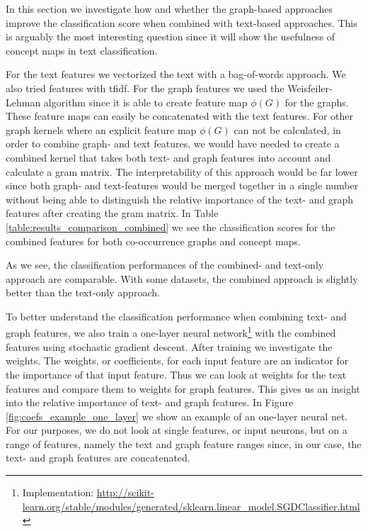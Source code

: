 In this section we investigate how and whether the graph-based approaches improve the classification score when combined with text-based approaches.
This is arguably the most interesting question since it will show the usefulness of concept maps in text classification.

For the text features we vectorized the text with a bag-of-words approach. We also tried features with tfidf.
For the graph features we used the Weisfeiler-Lehman algorithm since it is able to create feature map $\phi(G)$ for the graphs.
These feature maps can easily be concatenated with the text features.
For other graph kernels where an explicit feature map $\phi(G)$ can not be calculated, in order to combine graph- and text features, we would have needed to create a combined kernel that takes both text- and graph features into account and calculate a gram matrix.
The interpretability of this approach would be far lower since both graph- and text-features would be merged together in a single number without being able to distinguish the relative importance of the text- and graph features after creating the gram matrix.
In Table \ref{table:results_comparison_combined} we see the classification scores for the combined features for both co-occurrence graphs and concept maps.

As we see, the classification performances of the combined- and text-only approach are comparable.
With some datasets, the combined approach is slightly better than the text-only approach.


To better understand the classification performance when combining text- and graph features, we also train a one-layer neural network\footnote{Implementation: \url{http://scikit-learn.org/stable/modules/generated/sklearn.linear_model.SGDClassifier.html}} with the combined features using stochastic gradient descent. After training we investigate the weights.
The weights, or coefficients, for each input feature are an indicator for the importance of that input feature.
Thus we can look at weights for the text features and compare them to weights for graph features.
This gives us an insight into the relative importance of text- and graph features.
In Figure \ref{fig:coefs_example_one_layer} we show an example of an one-layer neural net.
For our purposes, we do not look at single features, or input neurons, but on a range of features, namely the text and graph feature ranges since, in our case, the text- and graph features are concatenated.


